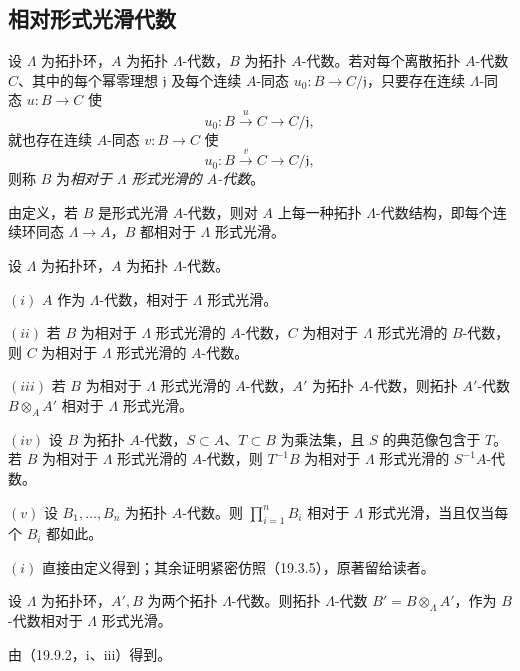 \subsection{相对形式光滑代数}
设 $\Lambda$ 为拓扑环，$A$ 为拓扑 $\Lambda$-代数，$B$ 为拓扑 $A$-代数。若对每个离散拓扑 $A$-代数 $C$、其中的每个幂零理想 $\mathfrak j$ 及每个连续 $A$-同态 $u_0:B\to C/\mathfrak j$，只要存在连续 $\Lambda$-同态 $u:B\to C$ 使
\[
 u_0:B\xrightarrow{u}C\longrightarrow C/\mathfrak j,
\]
就也存在连续 $A$-同态 $v:B\to C$ 使
\[
 u_0:B\xrightarrow{v}C\longrightarrow C/\mathfrak j,
\]
则称 $B$ 为\emph{相对于 $\Lambda$ 形式光滑的 $A$-代数}。

由定义，若 $B$ 是形式光滑 $A$-代数，则对 $A$ 上每一种拓扑 $\Lambda$-代数结构，即每个连续环同态 $\Lambda\to A$，$B$ 都相对于 $\Lambda$ 形式光滑。

设 $\Lambda$ 为拓扑环，$A$ 为拓扑 $\Lambda$-代数。

$(i)$ $A$ 作为 $\Lambda$-代数，相对于 $\Lambda$ 形式光滑。

$(ii)$ 若 $B$ 为相对于 $\Lambda$ 形式光滑的 $A$-代数，$C$ 为相对于 $\Lambda$ 形式光滑的 $B$-代数，则 $C$ 为相对于 $\Lambda$ 形式光滑的 $A$-代数。

$(iii)$ 若 $B$ 为相对于 $\Lambda$ 形式光滑的 $A$-代数，$A'$ 为拓扑 $A$-代数，则拓扑 $A'$-代数 $B\otimes_AA'$ 相对于 $\Lambda$ 形式光滑。

$(iv)$ 设 $B$ 为拓扑 $A$-代数，$S\subset A$、$T\subset B$ 为乘法集，且 $S$ 的典范像包含于 $T$。若 $B$ 为相对于 $\Lambda$ 形式光滑的 $A$-代数，则 $T^{-1}B$ 为相对于 $\Lambda$ 形式光滑的 $S^{-1}A$-代数。

$(v)$ 设 $B_1,\ldots,B_n$ 为拓扑 $A$-代数。则 $\prod_{i=1}^nB_i$ 相对于 $\Lambda$ 形式光滑，当且仅当每个 $B_i$ 都如此。

$(i)$ 直接由定义得到；其余证明紧密仿照（19.3.5），原著留给读者。

设 $\Lambda$ 为拓扑环，$A',B$ 为两个拓扑 $\Lambda$-代数。则拓扑 $\Lambda$-代数 $B'=B\otimes_\Lambda A'$，作为 $B$-代数相对于 $\Lambda$ 形式光滑。

由（19.9.2，i、iii）得到。

